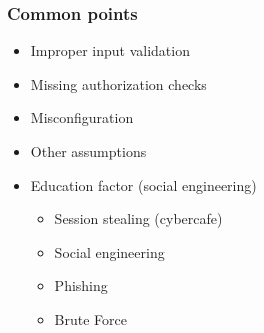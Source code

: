 \begin{frame}[t]
\frametitle{Common points}
\vspace{2em}
\begin{itemize}
\item Improper input validation
\item Missing authorization checks
\item Misconfiguration
\item Other assumptions
\pause
\item Education factor {\small (social engineering)}
	\pause
	\begin{itemize}
		\item<+-> Session stealing (cybercafe)
		\item<+-> Social engineering
		\item<+-> Phishing
		\item<+-> Brute Force
	\end{itemize}
\end{itemize}
\end{frame}
